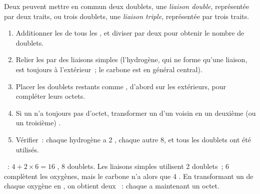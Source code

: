 \begin{definition}\label{def:g10:lewis-and-shape:multiple-bond}
Deux  peuvent mettre en commun deux doublets, une \emph{liaison
double}, représentée par deux traits, ou trois
doublets, une \emph{liaison triple}, représentée
par trois traits.
\end{definition}

\begin{method}\label{met:g10:lewis-and-shape:draw}
\begin{enumerate}
  \item Additionner les  de tous les , et
        diviser par deux pour obtenir le nombre de doublets.
  \item Relier les  par des liaisons simples (l'hydrogène, qui ne
        forme qu'une liaison, est toujours à l'extérieur~; le carbone est
        en général central).
  \item Placer les doublets restants comme , d'abord
        sur les  extérieurs, pour compléter leurs octets.
  \item Si un  n'a toujours pas d'octet, transformer un  d'un voisin en un deuxième (ou un troisième) .
  \item Vérifier~: chaque hydrogène a 2 , chaque autre  8,
        et tous les doublets ont été utilisés.
\end{enumerate}
\end{method}

\begin{example}\label{ex:g10:lewis-and-shape:co2}
~: $4 + 2 \times 6 = 16$ , 8 doublets. Les
liaisons simples  utilisent 2 doublets~; 6 
complètent les oxygènes, mais le carbone n'a alors que 4 . En
transformant un  de chaque oxygène en , on
obtient deux ~: chaque  a maintenant un octet.
\end{example}

